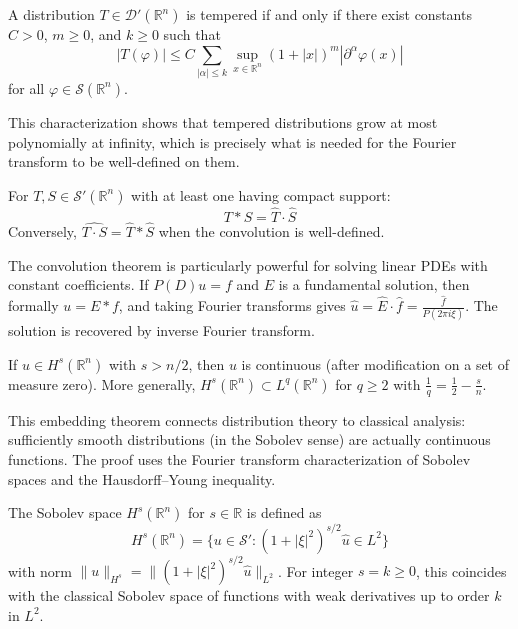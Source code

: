 \begin{theorem}
A distribution $T \in \mathcal{D}'(\mathbb{R}^n)$ is tempered if and only if there exist constants $C > 0$, $m \geq 0$, and $k \geq 0$ such that
\[|T(\varphi)| \leq C \sum_{|\alpha| \leq k} \sup_{x \in \mathbb{R}^n} (1 + |x|)^m |\partial^\alpha \varphi(x)|\]
for all $\varphi \in \mathcal{S}(\mathbb{R}^n)$.
\end{theorem}

This characterization shows that tempered distributions grow at most polynomially at infinity, which is precisely what is needed for the Fourier transform to be well-defined on them.

\begin{theorem}
For $T, S \in \mathcal{S}'(\mathbb{R}^n)$ with at least one having compact support:
\[\widehat{T * S} = \hat{T} \cdot \hat{S}\]
Conversely, $\widehat{T \cdot S} = \hat{T} * \hat{S}$ when the convolution is well-defined.
\end{theorem}

The convolution theorem is particularly powerful for solving linear PDEs with constant coefficients. If $P(D)u = f$ and $E$ is a fundamental solution, then formally $u = E * f$, and taking Fourier transforms gives $\hat{u} = \hat{E} \cdot \hat{f} = \frac{\hat{f}}{P(2\pi i \xi)}$. The solution is recovered by inverse Fourier transform.

\begin{theorem}
If $u \in H^s(\mathbb{R}^n)$ with $s > n/2$, then $u$ is continuous (after modification on a set of measure zero). More generally, $H^s(\mathbb{R}^n) \subset L^q(\mathbb{R}^n)$ for $q \geq 2$ with $\frac{1}{q} = \frac{1}{2} - \frac{s}{n}$.
\end{theorem}

This embedding theorem connects distribution theory to classical analysis: sufficiently smooth distributions (in the Sobolev sense) are actually continuous functions. The proof uses the Fourier transform characterization of Sobolev spaces and the Hausdorff--Young inequality.

\begin{theorem}
The Sobolev space $H^s(\mathbb{R}^n)$ for $s \in \mathbb{R}$ is defined as
\[H^s(\mathbb{R}^n) = \{u \in \mathcal{S}' : (1 + |\xi|^2)^{s/2} \hat{u} \in L^2\}\]
with norm $\|u\|_{H^s} = \|(1 + |\xi|^2)^{s/2} \hat{u}\|_{L^2}$. For integer $s = k \geq 0$, this coincides with the classical Sobolev space of functions with weak derivatives up to order $k$ in $L^2$.
\end{theorem}


